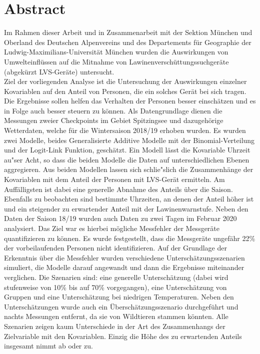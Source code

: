 \documentclass[12pt]{scrreprt}
\begin{document}
\chapter*{Abstract}
{\footnotesize Im Rahmen dieser Arbeit und in Zusammenarbeit mit der Sektion München und Oberland des Deutschen Alpenvereins und des Departements für Geographie der Ludwig-Maximilians-Universität München wurden die Auswirkungen von Umwelteinflüssen auf die Mitnahme von Lawinenverschüttungssuchgeräte (abgekürzt LVS-Geräte) untersucht. \\
Ziel der vorliegenden Analyse ist die Untersuchung der Auswirkungen einzelner Kovariablen auf den Anteil von Personen, die ein solches Gerät bei sich tragen.
Die Ergebnisse sollen helfen das Verhalten der Personen besser einschätzen und es in Folge auch besser steuern zu können. Als Datengrundlage dienen die Messungen zweier Checkpoints im Gebiet Spitzingsee und dazugehörige Wetterdaten, welche für die Wintersaison 2018/19 erhoben wurden.
Es wurden zwei Modelle, beides Generalisierte Additive Modelle mit der Binomial-Verteilung und der Logit-Link Funktion, geschätzt. Ein Modell lässt die Kovariable Uhrzeit au"ser Acht, so dass die beiden Modelle die Daten auf unterschiedlichen Ebenen aggregieren. Aus beiden Modellen lassen sich schlie"slich die Zusammenhänge der Kovariablen mit dem Anteil der Personen mit LVS-Gerät ermitteln. Am Auffälligsten ist dabei eine generelle Abnahme des Anteils über die Saison. Ebenfalls zu beobachten sind bestimmte Uhrzeiten, an denen der Anteil höher ist und ein steigender zu erwartender Anteil mit der Lawinenwarnstufe.
Neben den Daten der Saison 18/19 wurden auch Daten zu zwei Tagen im Februar 2020 analysiert. Das Ziel war es hierbei mögliche Messfehler der Messgeräte quantifizieren zu können. Es wurde festgestellt, dass die Messgeräte ungefähr 22\% der vorbeilaufenden Personen nicht identifizieren.
Auf der Grundlage der Erkenntnis über die Messfehler wurden verschiedene Unterschätzungsszenarien simuliert, die Modelle darauf angewandt und dann die Ergebnisse miteinander verglichen. Die Szenarien sind: eine generelle Unterschätzung (dabei wird stufenweise von 10\% bis auf 70\% vorgegangen), eine Unterschätzung von Gruppen und eine Unterschätzung bei niedrigen Temperaturen. Neben den Unterschätzungen wurde auch ein Überschätzungsszenario durchgeführt und nachts Messungen entfernt, da sie von Wildtieren stammen könnten. Alle Szenarien zeigen kaum Unterschiede in der Art des Zusammenhangs der Zielvariable mit den Kovariablen. Einzig die Höhe des zu erwartenden Anteils insgesamt nimmt ab oder zu.}
\end{document}
